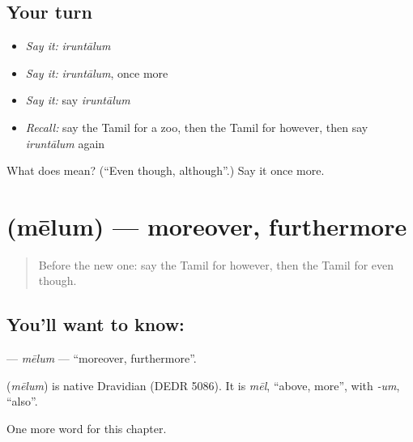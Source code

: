 \subsection*{Your turn}
\begin{itemize}
\raggedright
  \item \emph{Say it:} \emph{iruntālum}
  \item \emph{Say it:} \emph{iruntālum}, once more
  \item \emph{Say it:} say \emph{iruntālum}
  \item \emph{Recall:} say the Tamil for a zoo, then the Tamil for however, then say \emph{iruntālum} again
\end{itemize}

\begin{tcolorbox}[breakable,colback=teal!4,colframe=teal!35!black,title={Before you move on}]
What does  mean? (\textquotedblleft{}Even though, although\textquotedblright{}.) Say it once more.
\end{tcolorbox}
\section[\texorpdfstring{\ta{மேலும்} (mēlum)}{மேலும் (mēlum)}]{ (mēlum) — moreover, furthermore}

\label{lesson:TA-C176-melum}



\begin{quote}
Before the new one: say the Tamil for however, then the Tamil for even though.
\end{quote}

\subsection*{You'll want to know: }
\textbf{} — \emph{mēlum} — \textquotedblleft{}moreover, furthermore\textquotedblright{}.

\begin{cousinweb}
\textbf{} (\emph{mēlum}) is native Dravidian (DEDR 5086). It is \emph{mēl}, \textquotedblleft{}above, more\textquotedblright{}, with \emph{-um}, \textquotedblleft{}also\textquotedblright{}.
\end{cousinweb}

\begin{grammarlens}[title={What you've built}]
One more word for this chapter.
\end{grammarlens}

